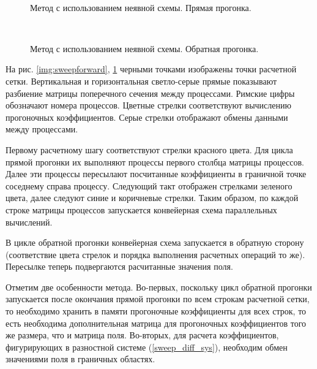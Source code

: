 \begin{figure}[h]
    \begin{center}
        \begin{minipage}{0.48\linewidth}
             \\
            \caption{Метод с использованием неявной схемы. Прямая прогонка.}
            \label{img:sweepforward}
        \end{minipage}
        \hfill
        \begin{minipage}{0.48\linewidth}
             \\
            \caption{Метод с использованием неявной схемы. Обратная прогонка.}
            \label{img:sweepbackward}
        \end{minipage}
    \end{center}
\end{figure}

На рис. \ref{img:sweepforward}, \ref{img:sweepbackward} черными точками изображены точки расчетной сетки.
Вертикальная и горизонтальная светло-серые прямые показывают разбиение матрицы поперечного сечения между процессами.
Римские цифры обозначают номера процессов.
Цветные стрелки соответствуют вычислению прогоночных коэффициентов.
Серые стрелки отображают обмены данными между процессами.

Первому расчетному шагу соответствуют стрелки красного цвета.
Для цикла прямой прогонки их выполняют процессы первого столбца матрицы процессов.
Далее эти процессы пересылают посчитанные коэффициенты в граничной точке соседнему справа процессу.
Следующий такт отображен стрелками зеленого цвета, далее следуют синие и коричневые стрелки.
Таким образом, по каждой строке матрицы процессов запускается конвейерная схема параллельных вычислений.

В цикле обратной прогонки конвейерная схема запускается в обратную сторону (соответствие цвета стрелок и порядка выполнения расчетных операций то же).
Пересылке теперь подвергаются расчитанные значения поля.

Отметим две особенности метода.
Во-первых, поскольку цикл обратной прогонки запускается после окончания прямой прогонки по всем строкам расчетной сетки, то необходимо хранить в памяти прогоночные коэффициенты для всех строк, то есть необходима дополнительная матрица для прогоночных коэффициентов того же размера, что и матрица поля.
Во-вторых, для расчета коэффициентов, фигурирующих в разностной системе (\ref{sweep_diff_sys}), необходим обмен значениями поля в граничных областях.

